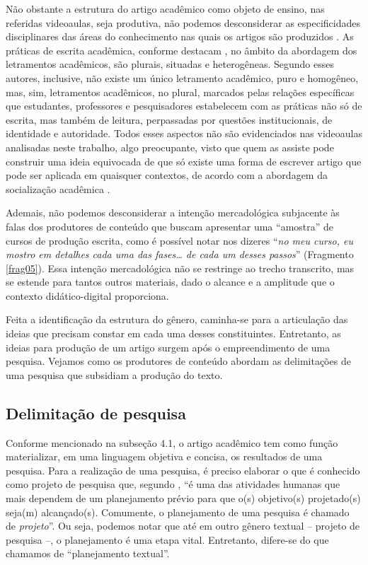 Não obstante a estrutura do artigo acadêmico como objeto de ensino, nas
referidas videoaulas, seja produtiva, não podemos desconsiderar as
especificidades disciplinares das áreas do conhecimento nas quais os
artigos são produzidos \cite{pereira2019}. As práticas de escrita
acadêmica, conforme destacam \cite{lea1998}, no âmbito da abordagem
dos letramentos acadêmicos, são plurais, situadas e heterogêneas.
Segundo esses autores, inclusive, não existe um único letramento
acadêmico, puro e homogêneo, mas, sim, letramentos acadêmicos, no
plural, marcados pelas relações específicas que estudantes, professores
e pesquisadores estabelecem com as práticas não só de escrita, mas
também de leitura, perpassadas por questões institucionais, de
identidade e autoridade. Todos esses aspectos não são evidenciados nas
videoaulas analisadas neste trabalho, algo preocupante, visto que quem
as assiste pode construir uma ideia equivocada de que só existe uma
forma de escrever artigo que pode ser aplicada em quaisquer contextos,
de acordo com a abordagem da socialização acadêmica \cite{lea1998}.

Ademais, não podemos desconsiderar a intenção mercadológica subjacente
às falas dos produtores de conteúdo que buscam apresentar uma
``amostra'' de cursos de produção escrita, como é possível notar nos
dizeres ``\emph{no meu curso, eu mostro em detalhes cada uma das
fases\ldots{} de cada um desses passos}'' (Fragmento \ref{frag05}).
Essa intenção mercadológica não se restringe ao trecho transcrito, mas
se estende para tantos outros materiais, dado o alcance e a amplitude
que o contexto didático-digital proporciona.

Feita a identificação da estrutura do gênero, caminha-se para a
articulação das ideias que precisam constar em cada uma desses
constituintes. Entretanto, as ideias para produção de um artigo surgem
após o empreendimento de uma pesquisa. Vejamos como os produtores de
conteúdo abordam as delimitações de uma pesquisa que subsidiam a
produção do texto.

\subsection{Delimitação de pesquisa}

Conforme mencionado na subseção 4.1, o artigo acadêmico tem como função
materializar, em uma linguagem objetiva e concisa, os resultados de uma
pesquisa. Para a realização de uma pesquisa, é preciso elaborar o que é
conhecido como projeto de pesquisa que, segundo \textcite[p.~51—52, grifo das autoras]{motta-roth2010}, ``é uma das atividades humanas que
mais dependem de um planejamento prévio para que o(s) objetivo(s)
projetado(s) seja(m) alcançado(s). Comumente, o planejamento de uma
pesquisa é chamado de \emph{projeto}''. Ou seja, podemos notar que até
em outro gênero textual -- projeto de pesquisa --, o planejamento é uma
etapa vital. Entretanto, difere-se do que chamamos de ``planejamento
textual''.

